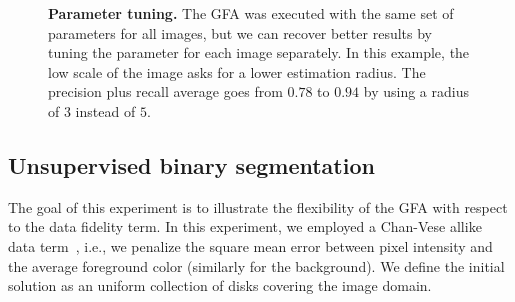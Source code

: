\documentclass[smallextended]{svjour3}
\begin{document}
\begin{figure}
\center
{}\hspace{1em}
\caption{\textbf{Parameter tuning.} The GFA was executed with the same set of parameters for all images, but we can recover better results by tuning the parameter for each image separately. In this example, the low scale of the image asks for a lower estimation radius. The precision plus recall average goes from $0.78$ to $0.94$ by using a radius of $3$ instead of $5$. }
\label{fig:coco-parameter-tuning}
\end{figure}
%
%
\subsection{Unsupervised binary segmentation}
The goal of this experiment is to illustrate the flexibility of the GFA with respect to the data fidelity term. In this experiment, we employed a Chan-Vese allike data term~\cite{chan01}, i.e., we penalize the square mean error between pixel intensity and the average foreground color (similarly for the background). We define the initial solution as an uniform collection of disks covering the image domain.
\end{document}

